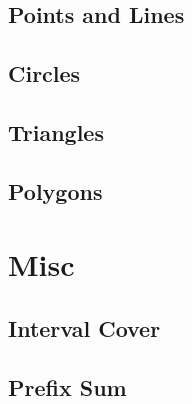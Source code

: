 \documentclass[a4paper,landscape,8pt]{article}
\begin{document}
\begin{multicols}{2}
\subsection{Points and Lines}


\subsection{Circles}


\subsection{Triangles}


\subsection{Polygons}



\section{Misc}

\subsection{Interval Cover}


\subsection{Prefix Sum}



\end{multicols}
\end{document}
